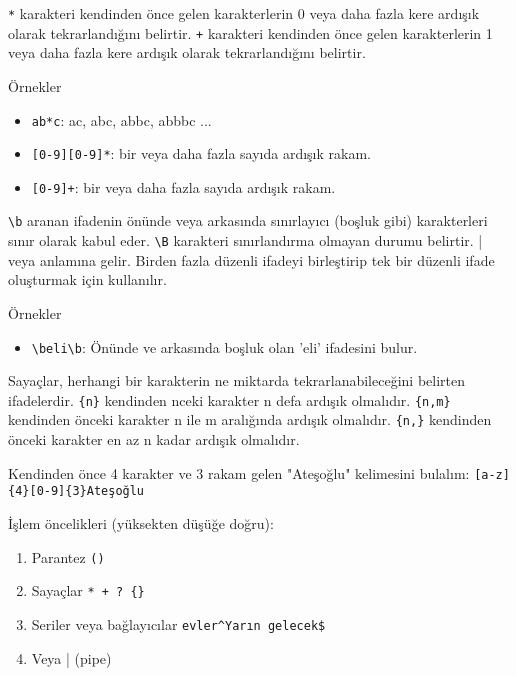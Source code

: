 \verb|*| karakteri kendinden önce gelen karakterlerin 0 veya daha fazla kere ardışık olarak tekrarlandığını belirtir. \verb|+| karakteri kendinden önce gelen karakterlerin 1 veya daha fazla kere ardışık olarak tekrarlandığını belirtir.

Örnekler
\begin{itemize}
    \item \verb|ab*c|: ac, abc, abbc, abbbc ...
    \item \verb|[0-9][0-9]*|: bir veya daha fazla sayıda ardışık rakam.
    \item \verb|[0-9]+|: bir veya daha fazla sayıda ardışık rakam.
\end{itemize}

\verb|\b| aranan ifadenin önünde veya arkasında sınırlayıcı (boşluk gibi) karakterleri sınır olarak kabul eder. \verb|\B| karakteri sınırlandırma olmayan durumu belirtir. | veya anlamına gelir. Birden fazla düzenli ifadeyi birleştirip tek bir düzenli ifade oluşturmak için kullanılır.

Örnekler
\begin{itemize}
    \item \verb|\beli\b|: Önünde ve arkasında boşluk olan 'eli' ifadesini bulur.
\end{itemize}

Sayaçlar, herhangi bir karakterin ne miktarda tekrarlanabileceğini belirten ifadelerdir. \verb|{n}| kendinden nceki karakter n defa ardışık olmalıdır. \verb|{n,m}| kendinden önceki karakter n ile m aralığında ardışık olmalıdır. \verb|{n,}| kendinden önceki karakter en az n kadar ardışık olmalıdır.

Kendinden önce 4 karakter ve 3 rakam gelen "Ateşoğlu" kelimesini bulalım: \verb|[a-z]{4}[0-9]{3}Ateşoğlu|

İşlem öncelikleri (yüksekten düşüğe doğru):
\begin{enumerate}
    \item Parantez \verb|()|
    \item Sayaçlar \verb|* + ? {}|
    \item Seriler veya bağlayıcılar \verb|evler^Yarın gelecek$|
    \item Veya | (pipe)
\end{enumerate}

